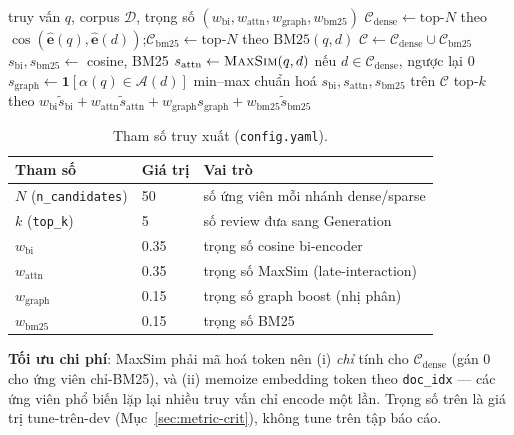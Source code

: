 \documentclass[12pt,a4paper]{article}
\begin{document}
\begin{algorithm}[H]
\caption{HybridRetrieve --- truy xuất lai 2 tầng (\texttt{rag/retrieval.py})}
\begin{algorithmic}[1]
\Require truy vấn $q$, corpus $\mathcal{D}$, trọng số $(w_{\text{bi}},w_{\text{attn}},w_{\text{graph}},w_{\text{bm25}})$
\State $\mathcal{C}_{\text{dense}}\gets\text{top-}N$ theo $\cos(\hat{\mathbf{e}}(q),\hat{\mathbf{e}}(d))$;\quad $\mathcal{C}_{\text{bm25}}\gets\text{top-}N$ theo $\text{BM25}(q,d)$
\State $\mathcal{C}\gets\mathcal{C}_{\text{dense}}\cup\mathcal{C}_{\text{bm25}}$
  \State $s_{\text{bi}},s_{\text{bm25}}\gets$ cosine, BM25 
  \State $s_{\text{attn}}\gets \textsc{MaxSim}(q,d)$ nếu $d\in\mathcal{C}_{\text{dense}}$, ngược lại $0$ 
  \State $s_{\text{graph}}\gets\mathbf{1}[\alpha(q)\in\mathcal{A}(d)]$
\EndFor
\State min--max chuẩn hoá $s_{\text{bi}},s_{\text{attn}},s_{\text{bm25}}$ trên $\mathcal{C}$
\State \Return top-$k$ theo $w_{\text{bi}}\tilde{s}_{\text{bi}}+w_{\text{attn}}\tilde{s}_{\text{attn}}+w_{\text{graph}}s_{\text{graph}}+w_{\text{bm25}}\tilde{s}_{\text{bm25}}$
\end{algorithmic}
\end{algorithm}

\begin{table}[H]
\centering\small
\caption{Tham số truy xuất (\texttt{config.yaml}).}
\begin{tabular}{lll}
\toprule
\textbf{Tham số} & \textbf{Giá trị} & \textbf{Vai trò} \\
\midrule
$N$ (\texttt{n\_candidates}) & 50 & số ứng viên mỗi nhánh dense/sparse \\
$k$ (\texttt{top\_k}) & 5 & số review đưa sang Generation \\
$w_{\text{bi}}$ & 0.35 & trọng số cosine bi-encoder \\
$w_{\text{attn}}$ & 0.35 & trọng số MaxSim (late-interaction) \\
$w_{\text{graph}}$ & 0.15 & trọng số graph boost (nhị phân) \\
$w_{\text{bm25}}$ & 0.15 & trọng số BM25 \\
\bottomrule
\end{tabular}
\end{table}

\noindent\textbf{Tối ưu chi phí}: MaxSim phải mã hoá token nên (i) \textit{chỉ} tính cho $\mathcal{C}_{\text{dense}}$ (gán $0$ cho ứng viên chỉ-BM25), và (ii) memoize embedding token theo \texttt{doc\_idx} --- các ứng viên phổ biến lặp lại nhiều truy vấn chỉ encode một lần. Trọng số trên là giá trị tune-trên-dev (Mục~\ref{sec:metric-crit}), không tune trên tập báo cáo.
\end{document}
